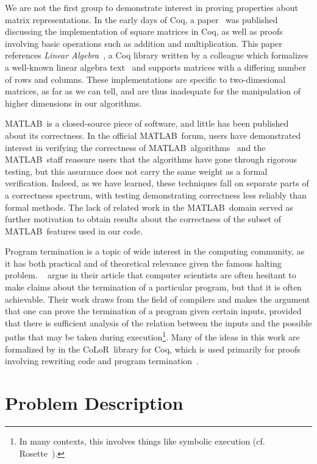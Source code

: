 \documentclass[11pt,conference]{IEEEtran}
\newcommand{\matlab}{MATLAB}
\newcommand{\colorlib}{CoLoR}
\theoremstyle{plain} %
\theoremstyle{definition}
\theoremstyle{remark}
\begin{document}
We are not the first group to demonstrate interest in proving properties about
matrix representations. In the early days of Coq, a
paper~\cite{magaud:hal-00955444} was published discussing the implementation of
square matrices in Coq, as well as proofs involving basic operations such as
addition and multiplication. This paper references \textit{Linear
Algebra}~\cite{lin_alg}, a Coq library written by a colleague which formalizes a
well-known linear algebra text~\cite{linear_algebra} and supports matrices with
a differing number of rows and columns. These implementations are specific to
two-dimesional matrices, as far as we can tell, and are thus inadequate for the
manipulation of higher dimensions in our algorithms.

\matlab\ is a closed-source piece of software, and little has been published about
its correctness. In the official \matlab\ forum, users have demonstrated interest
in verifying the correctness of \matlab\ algorithms~\cite{duenisch_2013} and the
\matlab\ staff reassure users that the algorithms have gone through rigorous
testing, but this assurance does not carry the same weight as a formal
verification. Indeed, as we have learned, these techniques fall on separate
parts of a correctness spectrum, with testing demonstrating correctness less
reliably than formal methods. The lack of related work in the \matlab\ domain
served as further motivation to obtain results about the correctness of the subset
of \matlab\ features used in our code.

Program termination is a topic of wide interest in the computing community, as
it has both practical and of theoretical relevance given the famous halting
problem. \citeauthor{Cook_2011}~\cite{Cook_2011} argue in their article that
computer scientists are often hesitant to make claims about the termination of a
particular program, but that it is often achievable. Their work draws from the
field of compilers and makes the argument that one can prove the termination of
a program given certain inputs, provided that there is sufficient analysis of
the relation between the inputs and the possible paths that may be taken during
execution\footnote{In many contexts, this involves things like symbolic
execution (cf. Rosette~\cite{Rosette}).}. Many of the ideas in this work are
formalized by \citeauthor{BLANQUI_2011} in the \colorlib\ library for Coq,
which is used primarily for proofs involving rewriting code and program
termination~\cite{BLANQUI_2011}.

\section{Problem Description}\label{S:problem_desc}
\end{document}
